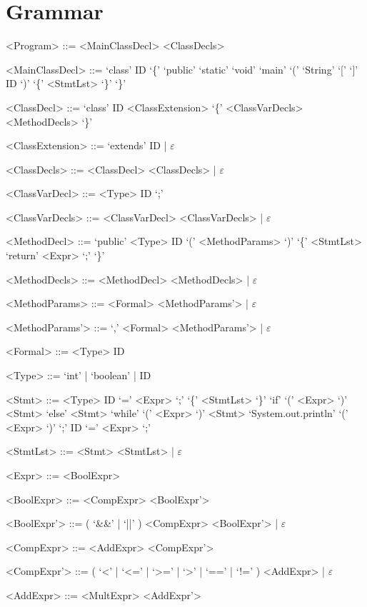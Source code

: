 \documentclass{report}
\begin{document}
\setlength{\grammarparsep}{4pt} %
\setlength{\grammarindent}{12em} %

\section*{Grammar}
\begin{grammar}

<Program> ::= <MainClassDecl> <ClassDecls>

<MainClassDecl> ::= `class' ID `\{' `public' `static' `void' `main' `(' `String' `[' `]' ID `)' `\{' <StmtLst> `\}' `\}'

<ClassDecl> ::= `class' ID <ClassExtension> `\{' <ClassVarDecls> <MethodDecls> `\}'

<ClassExtension> ::= `extends' ID | $\varepsilon$

<ClassDecls> ::= <ClassDecl> <ClassDecls> | $\varepsilon$

<ClassVarDecl> ::= <Type> ID `;'

<ClassVarDecls> ::= <ClassVarDecl> <ClassVarDecls> | $\varepsilon$

<MethodDecl> ::= `public' <Type> ID `(' <MethodParams> `)' `\{' <StmtLst> `return' <Expr> `;' `\}'

<MethodDecls> ::= <MethodDecl> <MethodDecls> | $\varepsilon$

<MethodParams> ::= <Formal> <MethodParams'> | $\varepsilon$

<MethodParams'> ::= `,' <Formal> <MethodParams'> | $\varepsilon$

<Formal> ::= <Type> ID

<Type> ::= `int' | `boolean' | ID

<Stmt> ::= <Type> ID `=' <Expr> `;'
\alt `\{' <StmtLst> `\}'
\alt `if' `(' <Expr> `)' <Stmt> `else' <Stmt>
\alt `while' `(' <Expr> `)' <Stmt>
\alt `System.out.println' `(' <Expr> `)' `;'
\alt ID `=' <Expr> `;'

<StmtLst> ::= <Stmt> <StmtLst> | $\varepsilon$

<Expr> ::= <BoolExpr>

<BoolExpr> ::= <CompExpr> <BoolExpr'>

<BoolExpr'> ::= ( `&&' | `||' ) <CompExpr> <BoolExpr'> | $\varepsilon$

<CompExpr> ::= <AddExpr> <CompExpr'>

<CompExpr'> ::= ( `<' | `<=' | `>=' | `>' | `==' | `!=' ) <AddExpr> | $\varepsilon$

<AddExpr> ::= <MultExpr> <AddExpr'>


\end{grammar}
\end{document}
